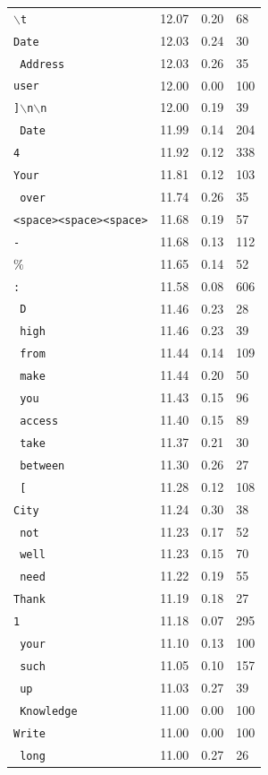 \begin{table}[h!]
\begin{tabular}{llll}
\texttt{$\backslash$t} & 12.07 & 0.20 & 68 \\
\texttt{Date} & 12.03 & 0.24 & 30 \\
\texttt{ Address} & 12.03 & 0.26 & 35 \\
\texttt{user} & 12.00 & 0.00 & 100 \\
\texttt{]$\backslash$n$\backslash$n} & 12.00 & 0.19 & 39 \\
\texttt{ Date} & 11.99 & 0.14 & 204 \\
\texttt{4} & 11.92 & 0.12 & 338 \\
\texttt{Your} & 11.81 & 0.12 & 103 \\
\texttt{ over} & 11.74 & 0.26 & 35 \\
\texttt{<space><space><space>} & 11.68 & 0.19 & 57 \\
\texttt{-} & 11.68 & 0.13 & 112 \\
\texttt{$\%$} & 11.65 & 0.14 & 52 \\
\texttt{:} & 11.58 & 0.08 & 606 \\
\texttt{ D} & 11.46 & 0.23 & 28 \\
\texttt{ high} & 11.46 & 0.23 & 39 \\
\texttt{ from} & 11.44 & 0.14 & 109 \\
\texttt{ make} & 11.44 & 0.20 & 50 \\
\texttt{ you} & 11.43 & 0.15 & 96 \\
\texttt{ access} & 11.40 & 0.15 & 89 \\
\texttt{ take} & 11.37 & 0.21 & 30 \\
\texttt{ between} & 11.30 & 0.26 & 27 \\
\texttt{ [} & 11.28 & 0.12 & 108 \\
\texttt{City} & 11.24 & 0.30 & 38 \\
\texttt{ not} & 11.23 & 0.17 & 52 \\
\texttt{ well} & 11.23 & 0.15 & 70 \\
\texttt{ need} & 11.22 & 0.19 & 55 \\
\texttt{Thank} & 11.19 & 0.18 & 27 \\
\texttt{1} & 11.18 & 0.07 & 295 \\
\texttt{ your} & 11.10 & 0.13 & 100 \\
\texttt{ such} & 11.05 & 0.10 & 157 \\
\texttt{ up} & 11.03 & 0.27 & 39 \\
\texttt{ Knowledge} & 11.00 & 0.00 & 100 \\
\texttt{Write} & 11.00 & 0.00 & 100 \\
\texttt{ long} & 11.00 & 0.27 & 26 \\
\bottomrule
\end{tabular}
\end{table}

